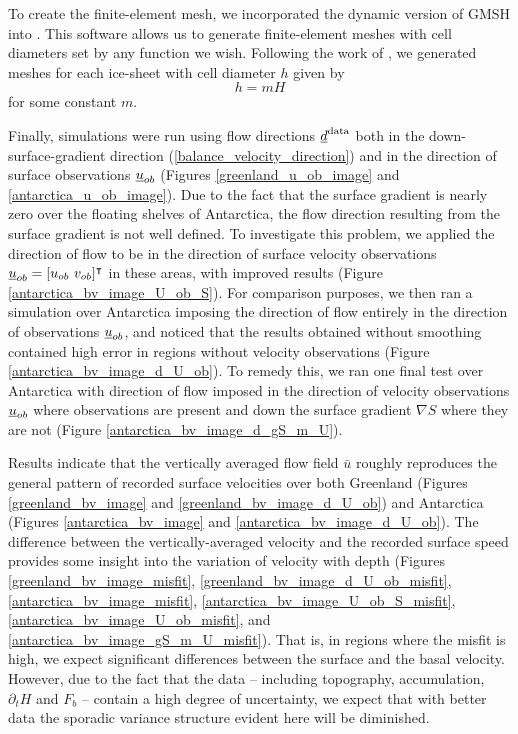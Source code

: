 To create the finite-element mesh, we incorporated the dynamic version of GMSH \citep{geuzaine_2009} into \CSLVR.  This software allows us to generate finite-element meshes with cell diameters set by any function we wish.  Following the work of \citet{brinkerhoff_2015}, we generated meshes for each ice-sheet with cell diameter $h$ given by 
$$h = mH$$
for some constant $m$.

Finally, simulations were run using flow directions $\underline{d}^{\text{data}}$ both in the down-surface-gradient direction (\ref{balance_velocity_direction}) and in the direction of surface observations $\underline{u}_{ob}$ (Figures \ref{greenland_u_ob_image} and \ref{antarctica_u_ob_image}).  Due to the fact that the surface gradient is nearly zero over the floating shelves of Antarctica, the flow direction resulting from the surface gradient is not well defined.  To investigate this problem, we applied the direction of flow to be in the direction of surface velocity observations $\rankone{u}_{ob} = [u_{ob}\ v_{ob}]\T$ in these areas, with improved results (Figure \ref{antarctica_bv_image_U_ob_S}).  For comparison purposes, we then ran a simulation over Antarctica imposing the direction of flow entirely in the direction of observations $\underline{u}_{ob}$, and noticed that the results obtained without smoothing contained high error in regions without velocity observations (Figure \ref{antarctica_bv_image_d_U_ob}).  To remedy this, we ran one final test over Antarctica with direction of flow imposed in the direction of velocity observations $\underline{u}_{ob}$ where observations are present and down the surface gradient $\nabla S$ where they are not (Figure \ref{antarctica_bv_image_d_gS_m_U}).

Results indicate that the vertically averaged flow field $\bar{u}$ roughly reproduces the general pattern of recorded surface velocities over both Greenland (Figures \ref{greenland_bv_image} and \ref{greenland_bv_image_d_U_ob}) and Antarctica (Figures \ref{antarctica_bv_image} and \ref{antarctica_bv_image_d_U_ob}).  The difference between the vertically-averaged velocity and the recorded surface speed provides some insight into the variation of velocity with depth (Figures \ref{greenland_bv_image_misfit}, \ref{greenland_bv_image_d_U_ob_misfit}, \ref{antarctica_bv_image_misfit}, \ref{antarctica_bv_image_U_ob_S_misfit}, \ref{antarctica_bv_image_U_ob_misfit}, and \ref{antarctica_bv_image_gS_m_U_misfit}).  That is, in regions where the misfit is high, we expect significant differences between the surface and the basal velocity.  However, due to the fact that the data -- including topography, accumulation, $\partial_t H$ and $F_b$ -- contain a high degree of uncertainty, we expect that with better data the sporadic variance structure evident here will be diminished.

